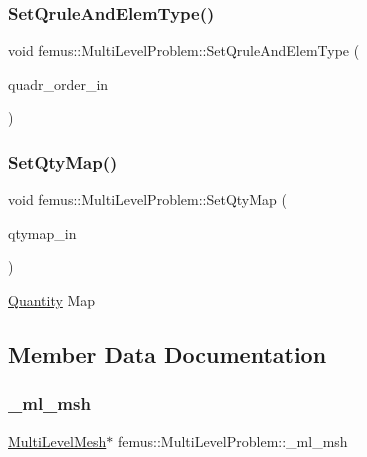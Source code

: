 \subsubsection{\texorpdfstring{Set\+Qrule\+And\+Elem\+Type()}{SetQruleAndElemType()}}
{\footnotesize\ttfamily void femus\+::\+Multi\+Level\+Problem\+::\+Set\+Qrule\+And\+Elem\+Type (\begin{DoxyParamCaption}\item[{const std\+::string}]{quadr\+\_\+order\+\_\+in }\end{DoxyParamCaption})}

\mbox{\label{classfemus_1_1_multi_level_problem_a9f936cd6d8b12a03db8bc9c60b2dfde5}} 
\subsubsection{\texorpdfstring{Set\+Qty\+Map()}{SetQtyMap()}}
{\footnotesize\ttfamily void femus\+::\+Multi\+Level\+Problem\+::\+Set\+Qty\+Map (\begin{DoxyParamCaption}\item[{const \mbox{\hyperlink{classfemus_1_1_quantity_map}{Quantity\+Map}} $\ast$}]{qtymap\+\_\+in }\end{DoxyParamCaption})\hspace{0.3cm}{\ttfamily [inline]}}

\mbox{\hyperlink{classfemus_1_1_quantity}{Quantity}} Map 

\subsection{Member Data Documentation}
\mbox{\label{classfemus_1_1_multi_level_problem_a946d39c3fba7fac859822702248fe065}} 
\subsubsection{\texorpdfstring{\+\_\+ml\+\_\+msh}{\_ml\_msh}}
{\footnotesize\ttfamily \mbox{\hyperlink{classfemus_1_1_multi_level_mesh}{Multi\+Level\+Mesh}}$\ast$ femus\+::\+Multi\+Level\+Problem\+::\+\_\+ml\+\_\+msh}

